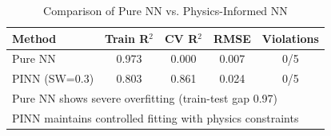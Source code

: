 
\begin{table}[htbp]
\centering
\caption{Comparison of Pure NN vs. Physics-Informed NN}
\label{tab:pure_nn_comparison}
\begin{tabular}{lcccc}
\hline
\textbf{Method} & \textbf{Train R$^2$} & \textbf{CV R$^2$} & \textbf{RMSE} & \textbf{Violations} \\
\hline
Pure NN & 0.973 & 0.000 & 0.007 & 0/5 \\
PINN (SW=0.3) & 0.803 & 0.861 & 0.024 & 0/5 \\
\hline
\multicolumn{5}{l}{\small Pure NN shows severe overfitting (train-test gap 0.97)} \\
\multicolumn{5}{l}{\small PINN maintains controlled fitting with physics constraints} \\
\end{tabular}
\end{table}
